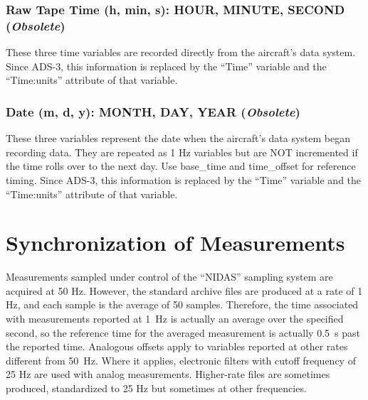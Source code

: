 \documentclass[
]{book}
\begin{document}
\hypertarget{hms}{%
\subsubsection*{\texorpdfstring{Raw Tape Time (h, min, s): HOUR, MINUTE, SECOND (\emph{Obsolete})}{Raw Tape Time (h, min, s): HOUR, MINUTE, SECOND (Obsolete)}}\label{hms}}

These three time variables are recorded directly from the aircraft's data system. Since ADS-3, this information is replaced by the ``Time'' variable and the ``Time:units'' attribute of that variable.

\hypertarget{mdy}{%
\subsubsection*{\texorpdfstring{Date (m, d, y): MONTH, DAY, YEAR (\emph{Obsolete})}{Date (m, d, y): MONTH, DAY, YEAR (Obsolete)}}\label{mdy}}

These three variables represent the date when the aircraft's data system began recording data. They are repeated as 1 Hz variables but are NOT incremented if the time rolls over to the next day. Use base\_time and time\_offset for reference timing. Since ADS-3, this information is replaced by the ``Time'' variable and the ``Time:units'' attribute of that variable.

\hypertarget{synchronization-of-measurements}{%
\section{Synchronization of Measurements}\label{synchronization-of-measurements}}

Measurements sampled under control of the ``NIDAS'' sampling system are acquired at 50 Hz. However, the standard archive files are produced at a rate of 1 Hz, and each sample is the average of 50 samples. Therefore, the time associated with measurements reported at 1~Hz is actually an average over the specified second, so the reference time for the averaged measurement is actually 0.5~s past the reported time. Analogous offsets apply to variables reported at other rates different from 50~Hz. Where it applies, electronic filters with cutoff frequency of 25 Hz are used with analog measurements. Higher-rate files are sometimes produced, standardized to 25 Hz but sometimes at other frequencies.
\end{document}
